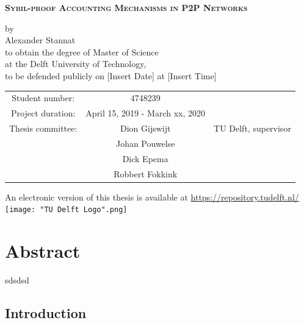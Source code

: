 \documentclass[11pt,a4paper]{report}
\theoremstyle{definition}
\theoremstyle{theorem}
\theoremstyle{proposition}
\theoremstyle{corollary}
\theoremstyle{lemma}
\theoremstyle{example}
\theoremstyle{remark}
\begin{document}
\bigskip\noindent
\begin{center}{\bf{\Huge \textsc{Sybil-proof Accounting Mechanisms in P2P Networks}}}\end{center}\vspace{2em}
\begin{center}
by \vspace{3em}\\
{\Huge Alexander Stannat}\vspace{4em}\\ 
to obtain the degree of Master of Science \vspace{1em}\\
at the Delft University of Technology, \vspace{1em}\\
to be defended publicly on [Insert Date] at [Insert Time]\vspace{20em}

\begin{tabular}{ccc}
Student number: & 4748239 & \\
Project duration: & April 15, 2019 - March xx, 2020 & \\
Thesis committee: & Dion Gijswijt & TU Delft, supervisor \\
				  & Johan Pouwelse & \\
				  & Dick Epema & \\
				  & Robbert Fokkink\vspace{3em}\\ 
\end{tabular}

\noindent{}An electronic version of this thesis is available at \href{http://repository.tudelft.nl/}{https://repository.tudelft.nl/} \vspace{3em}\\

\texttt{[image: "TU Delft Logo".png]}  \\
\end{center}

\newpage
\chapter*{Abstract}
sdsdsd

\setcounter{tocdepth}{2}
\tableofcontents
\newpage
{}
\section{Introduction}
\label{sec:Introduction}
\end{document}
